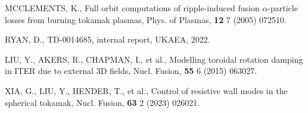 \documentclass[10pt, a4paper, twoside]{article}
\begin{document}
\begin{thebibliography}{9}
    MCCLEMENTS, K.,
    Full orbit computations of ripple-induced fusion $\alpha$-particle losses from burning tokamak plasmas,
    Phys. of Plasmas,
    \textbf{12} 7
    (2005)
    072510.

    RYAN, D., 
    TD-0014685, 
    internal report, 
    UKAEA, 
    2022.

    LIU, Y., AKERS, R., CHAPMAN, I., et al.,
    Modelling toroidal rotation damping in ITER due to external 3D fields,
    Nucl. Fusion,
    \textbf{55} 6
    (2015)
    063027.

    XIA, G., LIU, Y., HENDER, T., et al.,
    Control of resistive wall modes in the spherical tokamak,
    Nucl. Fusion,
    \textbf{63} 2
    (2023)
    026021.

\end{thebibliography}
\end{document}
